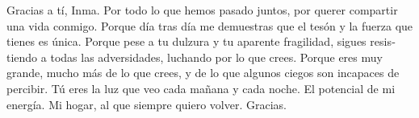 \begin{otherlanguage}{spanish}
Gracias a tí, Inma. Por todo lo que hemos pasado juntos, por querer compartir una vida conmigo. Porque día tras día me demuestras que el tesón y la fuerza que tienes es única. Porque pese a tu dulzura y tu aparente fragilidad, sigues resistiendo a todas las adversidades, luchando por lo que crees. Porque eres muy grande, mucho más de lo que crees, y de lo que algunos ciegos son incapaces de percibir. Tú eres la luz que veo cada mañana y cada noche. El potencial de mi energía. Mi hogar, al que siempre quiero volver. Gracias.

\end{otherlanguage}
%


